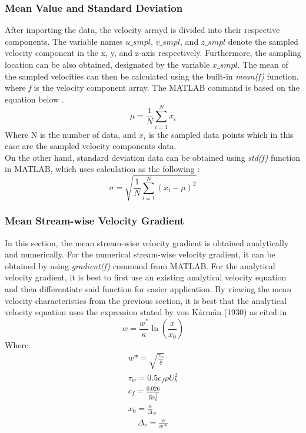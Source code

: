 \documentclass[11pt]{article}
\begin{document}
\subsubsection{Mean Value and Standard Deviation}
\label{sc: meanvelostd}
After importing the data, the velocity arrayd is divided into their respective components. The variable names $u\_smpl$, $v\_smpl$, and $z\_smpl$ denote the sampled velocity component in the x, y, and z-axis respectively. Furthermore, the sampling location can be also obtained, designated by the variable $x\_smpl$. The mean of the sampled velocities can then be calculated using the built-in \textit{mean(f)} function, where \textit{f} is the velocity component array. The MATLAB command is based on the equation below \citep{NCL2023a}.
\begin{equation}
    \mu = \frac{1}{N} \sum^N_{i=1}{x_i}
\end{equation}
Where N is the number of data, and $x_i$ is the sampled data points which in this case are the sampled velocity components data.\\
\newline
On the other hand, standard deviation data can be obtained using \textit{std(f)} function in MATLAB, which uses calculation as the following \citep{NCL2023b}:
\begin{equation}
    \sigma = \sqrt{\frac{1}{N}\sum^N_{i=1}{(x_i-\mu)^2}}
\end{equation}


\subsubsection{Mean Stream-wise Velocity Gradient}
\label{sc: Velograd}
In this section, the mean stream-wise velocity gradient is obtained analytically and numerically. For the numerical stream-wise velocity gradient, it can be obtained by using \textit{gradient(f)} command from MATLAB. For the analytical velocity gradient, it is best to first use an existing analytical velocity equation and then differentiate said function for easier application. By viewing the mean velocity characteristics from the previous section, it is best that the analytical velocity equation uses the expression stated by von Kármán (1930) as cited in \citet[p.1]{Smart2022}
\begin{equation}
    w = \frac{w^*}{\kappa}\ln\left({\frac{x}{x_0}}\right)
\end{equation}
Where:
\begin{gather}
    w* = \sqrt{\frac{\tau_w}{\varrho}} \\
    \tau_w = 0.5c_f\rho U_b^2 \\
    c_f = \frac{0.026}{Re_b^{\frac12}}\\
    x_0 = \frac\kappa\Delta_v
\end{gather}
\begin{gather}
    \Delta_v = \frac{\nu}{w*}
\end{gather}
\end{document}
